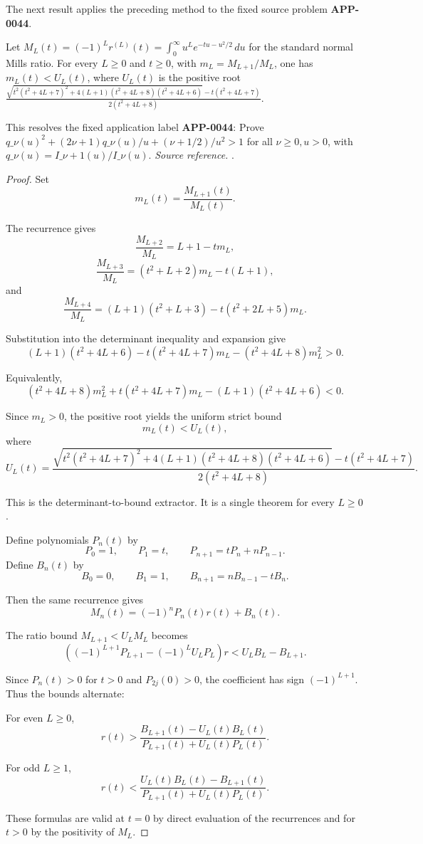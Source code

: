 The next result applies the preceding method to the fixed source problem \textbf{APP-0044}.
\begin{corollary}
\label{res:from-mills-all-l-moment-ratio-quadratic-bound}
Let \(M_L(t)=(-1)^L r^{(L)}(t)=\int_0^\infty u^L e^{-tu-u^2/2}\,du\) for the standard normal Mills ratio. For every \(L\ge0\) and \(t\ge0\), with \(m_L=M_{L+1}/M_L\), one has \(m_L(t)<U_L(t)\), where \(U_L(t)\) is the positive root \(\frac{\sqrt{t^2(t^2+4L+7)^2+4(L+1)(t^2+4L+8)(t^2+4L+6)}-t(t^2+4L+7)}{2(t^2+4L+8)}\).

This resolves the fixed application label \textbf{APP-0044}: Prove \(q\_\nu(u)^2+(2\nu+1)q\_\nu(u)/u+(\nu+1/2)/u^2>1\) for all \(\nu\ge0,u>0\), with \(q\_\nu(u)=I\_{\nu+1}(u)/I\_\nu(u)\).
\emph{Source reference.} \cite{app-app-0044-source}.
\end{corollary}
\begin{proof}
Set
\[
m_L(t)=\frac{M_{L+1}(t)}{M_L(t)}.
\]

The recurrence gives
\[
\frac{M_{L+2}}{M_L}=L+1-tm_L,
\]
\[
\frac{M_{L+3}}{M_L}=(t^2+L+2)m_L-t(L+1),
\]
and
\[
\frac{M_{L+4}}{M_L}=(L+1)(t^2+L+3)-t(t^2+2L+5)m_L.
\]

Substitution into the determinant inequality and expansion give
\[
(L+1)(t^2+4L+6)-t(t^2+4L+7)m_L-(t^2+4L+8)m_L^2>0.
\]

Equivalently,
\[
(t^2+4L+8)m_L^2+t(t^2+4L+7)m_L-(L+1)(t^2+4L+6)<0.
\]

Since \(m_L>0\), the positive root yields the uniform strict bound
\[
m_L(t)<U_L(t),
\]
where
\[
U_L(t)=
\frac{
\sqrt{t^2(t^2+4L+7)^2+4(L+1)(t^2+4L+8)(t^2+4L+6)}
-t(t^2+4L+7)
}
{2(t^2+4L+8)}.
\]

This is the determinant-to-bound extractor. It is a single theorem for every \(L\ge0\).

Define polynomials \(P_n(t)\) by
\[
P_0=1,\qquad P_1=t,\qquad P_{n+1}=tP_n+nP_{n-1}.
\]
Define \(B_n(t)\) by
\[
B_0=0,\qquad B_1=1,\qquad B_{n+1}=nB_{n-1}-tB_n.
\]

Then the same recurrence gives
\[
M_n(t)=(-1)^nP_n(t)r(t)+B_n(t).
\]

The ratio bound \(M_{L+1}<U_LM_L\) becomes
\[
\left((-1)^{L+1}P_{L+1}-(-1)^L U_LP_L\right)r
<U_LB_L-B_{L+1}.
\]

Since \(P_n(t)>0\) for \(t>0\) and \(P_{2j}(0)>0\), the coefficient has sign \((-1)^{L+1}\). Thus the bounds alternate:

For even \(L\ge0\),
\[
r(t)>
\frac{B_{L+1}(t)-U_L(t)B_L(t)}
{P_{L+1}(t)+U_L(t)P_L(t)}.
\]

For odd \(L\ge1\),
\[
r(t)<
\frac{U_L(t)B_L(t)-B_{L+1}(t)}
{P_{L+1}(t)+U_L(t)P_L(t)}.
\]

These formulas are valid at \(t=0\) by direct evaluation of the recurrences and for \(t>0\) by the positivity of \(M_L\).
\end{proof}

